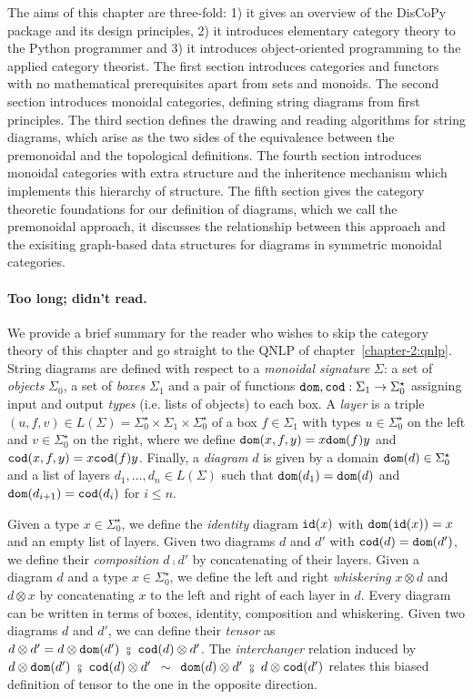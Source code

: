 The aims of this chapter are three-fold: 1) it gives an overview of the DisCoPy package and its design principles, 2) it introduces elementary category theory to the Python programmer and 3) it introduces object-oriented programming to the applied category theorist.
The first section introduces categories and functors with no mathematical prerequisites apart from sets and monoids.
The second section introduces monoidal categories, defining string diagrams from first principles.
The third section defines the drawing and reading algorithms for string diagrams, which arise as the two sides of the equivalence between the premonoidal and the topological definitions.
The fourth section introduces monoidal categories with extra structure and the inheritence mechanism which implements this hierarchy of structure.
The fifth section gives the category theoretic foundations for our definition of diagrams, which we call the premonoidal approach, it discusses the relationship between this approach and the exisiting graph-based data structures for diagrams in symmetric monoidal categories.

\paragraph{Too long; didn't read.}
We provide a brief summary for the reader who wishes to skip the category theory of this chapter and go straight to the QNLP of chapter~\ref{chapter-2:qnlp}.
String diagrams are defined with respect to a \emph{monoidal signature} $\Sigma$: a set of \emph{objects} $\Sigma_0$, a set of \emph{boxes} $\Sigma_1$ and a pair of functions $\mathtt{dom}, \mathtt{cod} : \Sigma_1 \to \Sigma_0^\star$ assigning input and output \emph{types} (i.e. lists of objects) to each box.
A \emph{layer} is a triple $(u, f, v) \in L(\Sigma) = \Sigma_0^\star \times \Sigma_1 \times \Sigma_0^\star$ of a box $f \in \Sigma_1$ with types $u \in \Sigma_0^\star$ on the left and $v \in \Sigma_0^\star$ on the right, where we define $\mathtt{dom}(x, f, y) = x \mathtt{dom}(f) y$ and $\mathtt{cod}(x, f, y) = x \mathtt{cod}(f) y$.
Finally, a \emph{diagram} $d$ is given by a domain $\mathtt{dom}(d) \in \Sigma_0^\star$ and a list of layers $d_1, \dots, d_n \in L(\Sigma)$ such that $\mathtt{dom}(d_1) = \mathtt{dom}(d)$ and $\mathtt{dom}(d_{i + 1}) = \mathtt{cod}(d_i)$ for $i \leq n$.

Given a type $x \in \Sigma_0^\star$, we define the \emph{identity} diagram $\mathtt{id}(x)$ with $\mathtt{dom}(\mathtt{id}(x)) = x$ and an empty list of layers.
Given two diagrams $d$ and $d'$ with $\mathtt{cod}(d) = \mathtt{dom}(d')$, we define their \emph{composition} $d \fcmp d'$ by concatenating of their layers.
Given a diagram $d$ and a type $x \in \Sigma_0^\star$, we define the left and right \emph{whiskering} $x \otimes d$ and $d \otimes x$ by concatenating $x$ to the left and right of each layer in $d$.
Every diagram can be written in terms of boxes, identity, composition and whiskering.
Given two diagrams $d$ and $d'$, we can define their \emph{tensor} as $d \otimes d' = d \otimes \dom(d') \ \fcmp \ \cod(d) \otimes d'$.
The \emph{interchanger} relation induced by $d \otimes \dom(d') \ \fcmp \ \cod(d) \otimes d' \s \sim \s \dom(d) \otimes d' \ \fcmp \ d \otimes \cod(d')$ relates this biased definition of tensor to the one in the opposite direction.

